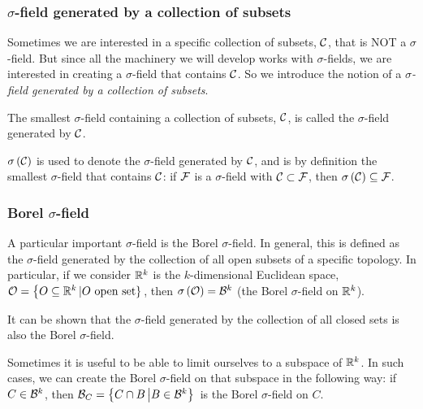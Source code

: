 \documentclass[]{book}
\theoremstyle{definition}
\theoremstyle{definition}
\theoremstyle{definition}
\theoremstyle{remark}
\let\BeginKnitrBlock\begin \let\EndKnitrBlock\end
\begin{document}
\subsubsection{\texorpdfstring{\(\sigma\)-field generated by a
collection of
subsets}{\textbackslash{}sigma-field generated by a collection of subsets}}\label{sigma-field-generated-by-a-collection-of-subsets}

Sometimes we are interested in a specific collection of subsets, \(\mathcal{C}\),
that is NOT a \(\sigma\)-field. But since all the machinery we will
develop works with \(\sigma\)-fields, we are interested in creating a
\(\sigma\)-field that contains \(\mathcal{C}\). So we introduce the notion of a
\emph{\(\sigma\)-field generated by a collection of subsets}.

\BeginKnitrBlock{definition}[Generated $\sigma$-field]
\protect\hypertarget{def:unnamed-chunk-2}{}{\label{def:unnamed-chunk-2}
\iffalse (Generated \(\sigma\)-field) \fi{} }The smallest
\(\sigma\)-field containing a collection of subsets, \(\mathcal{C}\), is called
the \(\sigma\)-field generated by \(\mathcal{C}\).
\EndKnitrBlock{definition}

\(\sigma\left(\mathcal{C}\right)\) is used to denote the \(\sigma\)-field
generated by \(\mathcal{C}\), and is by definition the smallest \(\sigma\)-field
that contains \(\mathcal{C}\): if \(\mathcal{F}\) is a \(\sigma\)-field with
\(\mathcal{C} \subset \mathcal{F}\), then \(\sigma\left(\mathcal{C}\right) \subseteq \mathcal{F}\).

\subsubsection{\texorpdfstring{Borel
\(\sigma\)-field}{Borel \textbackslash{}sigma-field}}\label{borel-sigma-field}

A particular important \(\sigma\)-field is the Borel \(\sigma\)-field.
In general, this is defined as the \(\sigma\)-field generated by the
collection of all open subsets of a specific topology. In particular, if
we consider \(\mathbb{R}^k\) is the \(k\)-dimensional Euclidean space,
\(\mathcal{O} = \left\{O \subseteq \mathbb{R}^k \left | O\ \text{open set} \right\}\right.\),
then \(\sigma\left(\mathcal{O}\right) = \mathcal{B}^k\) (the Borel \(\sigma\)-field on
\(\mathbb{R}^k\)).

It can be shown that the \(\sigma\)-field generated by the collection of
all closed sets is also the Borel \(\sigma\)-field.

Sometimes it is useful to be able to limit ourselves to a subspace of
\(\mathbb{R}^k\). In such cases, we can create the Borel \(\sigma\)-field on
that subspace in the following way: if \(C \in \mathcal{B}^k\), then
\(\mathcal{B}_C = \left\{ C\cap B \left | B \in \mathcal{B}^k \right\}\right.\) is the
Borel \(\sigma\)-field on \(C\).
\end{document}
